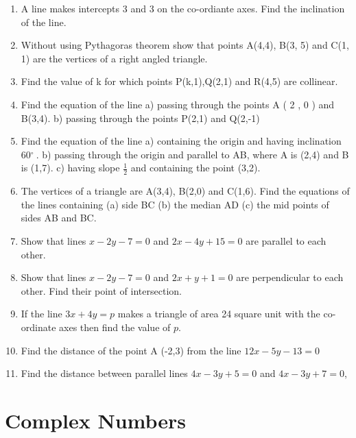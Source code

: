 \documentclass[14pt]{article}
\newcommand{\degree}{$^{\circ}\ $} %
\begin{document}
\begin{multicols}{2}
\begin{enumerate}[resume]
\item A line makes intercepts 3 and 3 on the
co-ordiante axes. Find the inclination of
the line.

\item Without using Pythagoras theorem show
that points A(4,4), B(3, 5) and C(1, 1)
are the vertices of a right angled triangle.

\item Find the value of k for which points
P(k,1),Q(2,1) and R(4,5) are collinear.

\item Find the equation of the line a) passing through the points A ( 2 , 0 ) and
B(3,4). b) passing through the points P(2,1) and
Q(2,-1)

\item Find the equation of the line a) containing the
origin and having inclination 60\degree. b) passing through the origin and parallel to AB, where A is (2,4) and B is (1,7). c) having slope $\frac{1}{2}$
and containing the point (3,2).

\item The vertices of a triangle are A(3,4), B(2,0)
and C(1,6). Find the equations of the lines containing (a) side BC (b) the median AD (c) the mid points of sides AB and BC.

\item Show that lines $x-2y-7=0$ and $2x-4y+15=0$ are parallel to each other.

\item Show that lines $x - 2 y - 7 =0$ and 
$2x + y + 1 = 0$ are perpendicular to each
other. Find their point of intersection.

\item If the line $3 x + 4 y = p$ makes a triangle
of area 24 square unit with the co-ordinate
axes then find the value of $p$.

\item Find the distance of the point A (-2,3) from the line $12 x - 5 y - 13 = 0$

\item Find the distance between parallel lines
$4x - 3 y + 5 = 0$ and $4x - 3y + 7 = 0$,


\end{enumerate} 



\section{Complex Numbers}
\noindent
\begin{enumerate}[resume]



\end{enumerate}
\end{multicols}
\end{document}
